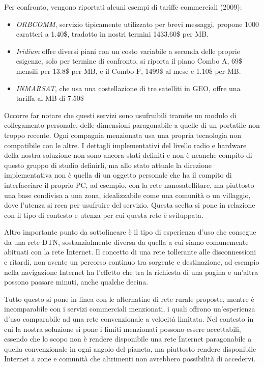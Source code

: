 \documentclass[12pt,a4paper,oneside]{book}
\begin{document}
		
		Per confronto, vengono riportati alcuni esempi di tariffe commerciali (2009):
		\begin{itemize}
			\item {\it ORBCOMM}, servizio tipicamente utilizzato per brevi messaggi, propone 1000 caratteri a 1.40\$, tradotto in nostri termini 1433.60\$ per MB.
			\item {\it Iridium} offre diversi piani con un costo variabile a seconda delle proprie esigenze, solo per termine di confronto, si riporta il piano Combo A, 69\$ mensili per 13.8\$ per MB, e il Combo F, 1499\$ al mese e 1.10\$ per MB.
			\item {\it INMARSAT}, che usa una costellazione di tre satelliti in GEO, offre una tariffa al MB di 7.50\$
		\end{itemize}
		Occorre far notare che questi servizi sono usufruibili tramite un modulo di collegamento personale, delle dimensioni paragonabile a quelle di un portatile non troppo recente. Ogni compagnia menzionata usa una propria tecnologia non compatibile con le altre. I dettagli implementativi del livello radio e hardware della nostra soluzione non sono ancora stati definiti e non è neanche compito di questo gruppo di studio definirli, ma allo stato attuale la direzione implementativa non è quella di un oggetto personale che ha il compito di interfacciare il proprio PC, ad esempio, con la rete nanosatellitare, ma piuttosto una base condivisa a una zona, idealizzabile come una comunità o un villaggio, dove l'utenza si reca per usufruire del servizio. Questa scelta si pone in relazione con il tipo di contesto e utenza per cui questa rete è sviluppata. 
		
		Altro importante punto da sottolineare è il tipo di esperienza d'uso che consegue da una rete DTN, sostanzialmente diversa da quella a cui siamo comunemente abituati con la rete Internet. Il concetto di una rete tollerante alle disconnessioni e ritardi, non avente un percorso continuo tra sorgente e destinazione, ad esempio nella navigazione Internet ha l'effetto che tra la richiesta di una pagina e un'altra possono passare minuti, anche qualche decina. 
		
		Tutto questo si pone in linea con le alternatine di rete rurale proposte, mentre è incomparabile con i servizi commerciali menzionati, i quali offrono un'esperienza d'uso comparabile ad una rete convenzionale a velocità limitata. Nel contesto in cui la nostra soluzione si pone i limiti menzionati possono essere accettabili, essendo che lo scopo non è rendere disponibile una rete Internet paragonabile a quella convenzionale in ogni angolo del pianeta, ma piuttosto rendere disponibile Internet a zone e comunità che altrimenti non avrebbero possibilità di accedervi.
		
\end{document}
